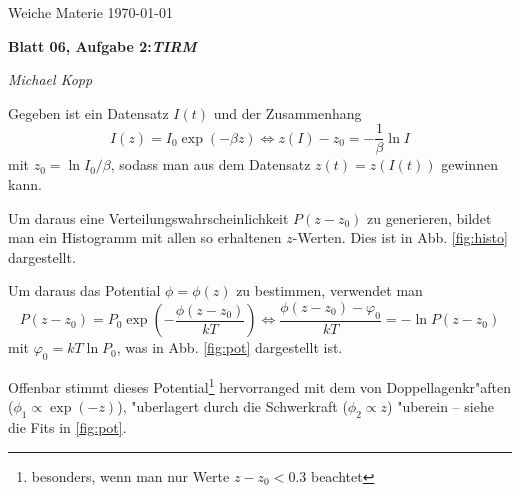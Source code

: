 \documentclass[dvipdfmx,a4paper,12pt]{article}
\newcommand{\gdw}{\ensuremath{\Leftrightarrow}}
\begin{document}
\newcommand{\NAME}{Michael Kopp}
\newcommand{\FACH}{Weiche Materie}
\newcommand{\TITEL}{Blatt 06, Aufgabe 2:\emph{TIRM}}
\newcommand{\DATUM}{\today}


\pagestyle{plain} 




\sloppy

\begin{center}
\FACH
\hfill
\DATUM
\end{center}

\vspace{-5mm} %

\begin{center}
  \begin{Large}
 \textbf{\TITEL}
  \end{Large}
\end{center}

\vspace{-3mm}

\begin{center}
\hrulefill
\quad 
\textit{\NAME}
\,
\hrulefill
\end{center}
 
 

 
\noindent
Gegeben ist ein Datensatz $I(t)$ und der Zusammenhang
\begin{equation}
  I(z) = I_0 \exp( - \beta z) \gdw
  z(I) - z_0 = - \frac{1}{\beta} \ln I
  \label{eq:Iz}
\end{equation}
mit $z_0 = \ln{ I_0 }/\beta$, sodass man aus dem Datensatz $z(t)=z(I(t))$ gewinnen kann.

Um daraus eine Verteilungswahrscheinlichkeit $P(z-z_0)$ zu generieren, bildet man ein Histogramm mit allen so erhaltenen $z$-Werten. Dies ist in Abb. \ref{fig:histo} dargestellt.


Um daraus das Potential $\phi = \phi(z)$ zu bestimmen, verwendet man
\begin{equation}
  P(z-z_0) = P_0 \exp\left( - \frac{\phi(z-z_0)}{kT} \right) \gdw
  \frac{\phi(z-z_0) - \varphi_0}{k T}= - \ln {P(z-z_0)}
  \label{eq:phi}
\end{equation}
mit $\varphi_0 = k T \ln P_0$, was in Abb.  \ref{fig:pot} dargestellt ist.

Offenbar stimmt dieses Potential\footnote{besonders, wenn man nur Werte $z-z_0 < 0.3$ beachtet} hervorranged mit dem von Doppellagenkr"aften ($\phi_1 \propto \exp(-z)$), "uberlagert durch die Schwerkraft ($\phi_2 \propto z$) "uberein -- siehe die Fits in \ref{fig:pot}.
\end{document}
